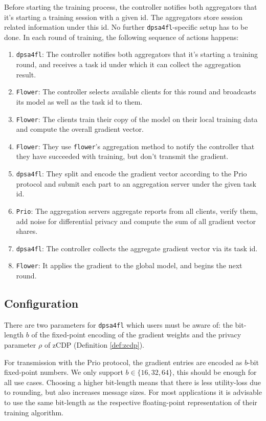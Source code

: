 \documentclass{article}
\begin{document}
Before starting the training process, the controller notifies both aggregators
that it's starting a training session with a given id. The aggregators store
session related information under this id. No further \texttt{dpsa4fl}-specific
setup has to be done.
In each round of training, the following sequence of actions happens:
\begin{enumerate}[itemsep=0mm]
\item \texttt{dpsa4fl}: The controller notifies both aggregators that it's
  starting a training round, and receives a task id under which it can collect
  the aggregation result.
\item \texttt{Flower}: The controller selects available clients for this round
  and broadcasts its model as well as the task id to them.
\item \texttt{Flower}: The clients train their copy of the model on their local training data and
  compute the overall gradient vector.
\item \texttt{Flower}: They use \texttt{flower}'s aggregation method to notify the
  controller that they have succeeded with training, but don't transmit the gradient.
\item \texttt{dpsa4fl}: They split and encode the gradient vector according to the Prio protocol
  and submit each part to an aggregation server under the given task id.
\item \texttt{Prio}: The aggregation servers aggregate reports from all clients, verify them,
  add noise for differential privacy and compute the sum of all gradient vector shares.
\item \texttt{dpsa4fl}: The controller collects the aggregate gradient vector via its task id.
\item \texttt{Flower}: It applies the gradient to the global model, and begins the next round.
\end{enumerate}

\subsection{Configuration}
There are two parameters for \texttt{dpsa4fl} which users must be aware of: the
bit-length $b$ of the fixed-point encoding of the gradient weights and the privacy
parameter $\rho$ of zCDP (Definition \ref{def:zcdp}).

For transmission with the
Prio protocol, the gradient entries are encoded as $b$-bit fixed-point numbers.
We only support $b \in \{16, 32, 64\}$, this should be enough for all
use cases. Choosing a higher bit-length means that there is less utility-loss
due to rounding, but also increases message sizes. For most applications it is
advisable to use the same bit-length as the respective floating-point
representation of their training algorithm.
\end{document}
